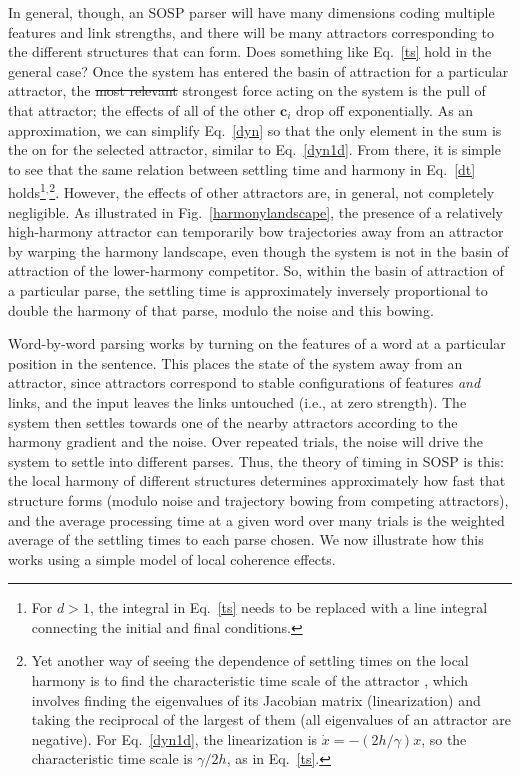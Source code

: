 \documentclass[10pt,letterpaper]{article}
\begin{document}
In general, though, an SOSP parser will have many dimensions coding multiple features and link strengths, and there will be many attractors corresponding to the different structures that can form. Does something like Eq.~\ref{ts} hold in the general case? %
Once the system has entered the basin of attraction for a particular attractor, the \sout{most relevant} strongest force acting on the system is the pull of that attractor; the effects of all of the other $\mathbf{c}_i$ drop off exponentially. As an approximation, we can simplify Eq.~\ref{dyn} so that the only element in the sum is the on for the selected attractor, similar to Eq.~\ref{dyn1d}. From there, it is simple to see that the same relation between settling time and harmony in Eq.~\ref{dt} holds\footnote{For $d > 1$, the integral in Eq.~\ref{ts} needs to be replaced with a line integral connecting the initial and final conditions.}$^,$\footnote{Yet another way of seeing the dependence of settling times on the local harmony is to find the characteristic time scale of the attractor \cite{strogatz1994nonlinear}, which involves finding the eigenvalues of its Jacobian matrix (linearization) and taking the reciprocal of the largest of them (all eigenvalues of an attractor are negative). For Eq.~\ref{dyn1d}, the linearization is $\dot{x} = -(2h/\gamma)x$, so the characteristic time scale is $\gamma / 2h$, as in Eq.~\ref{ts}.}. However, the effects of other attractors are, in general, not completely negligible. As illustrated in Fig.~\ref{harmonylandscape}, the presence of a relatively high-harmony attractor can temporarily bow trajectories away from an attractor by warping the harmony landscape, even though the system is not in the basin of attraction of the lower-harmony competitor. So, within the basin of attraction of a particular parse, the settling time is approximately inversely proportional to double the harmony of that parse, modulo the noise and this bowing.

Word-by-word parsing works by turning on the features of a word at a particular position in the sentence. This places the state of the system away from an attractor, since attractors correspond to stable configurations of features \emph{and} links, and the input leaves the links untouched (i.e., at zero strength). The system then settles towards one of the nearby attractors according to the harmony gradient and the noise. Over repeated trials, the noise will drive the system to settle into different parses. %
Thus, the theory of timing in SOSP is this: the local harmony of different structures determines approximately how fast that structure forms (modulo noise and trajectory bowing from competing attractors), and the average processing time at a given word over many trials is the weighted average of the settling times to each parse chosen. We now illustrate how this works using a simple model of local coherence effects.
\end{document}
